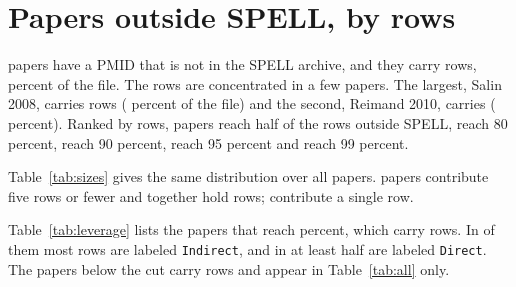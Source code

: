 
\section{Papers outside SPELL, by rows}\label{sec:leverage}

\ytNOutsidePapers{} papers have a PMID that is not in the SPELL archive, and
they carry \ytNOutsideRows{} rows, \ytPctOutsideRows{} percent of the file. The
rows are concentrated in a few papers. The largest, Salin 2008, carries
\ytTopOneRows{} rows (\ytTopOnePct{} percent of the file) and the second,
Reimand 2010, carries \ytTopTwoRows{} (\ytTopTwoPct{} percent). Ranked by rows,
\ytNPapersToFifty{} papers reach half of the rows outside SPELL,
\ytNPapersToEighty{} reach 80 percent, \ytNPapersToNinety{} reach 90 percent,
\ytNPapersToNinetyFive{} reach 95 percent and \ytNPapersToNinetyNine{} reach 99
percent.

Table~\ref{tab:sizes} gives the same distribution over all \ytNPapers{} papers.
\ytNFiveRowPapers{} papers contribute five rows or fewer and together hold
\ytNFiveRowRows{} rows; \ytNOneRowPapers{} contribute a single row.



Table~\ref{tab:leverage} lists the \ytNLeveragePapers{} papers that reach
\ytLeveragePct{} percent, which carry \ytNLeverageRows{} rows. In
\ytNLeverageIndirectPapers{} of them most rows are labeled \texttt{Indirect},
and in \ytNLeverageDirectPapers{} at least half are labeled \texttt{Direct}.
The \ytNTailPapers{} papers below the cut carry \ytNTailRows{} rows and appear
in Table~\ref{tab:all} only.


